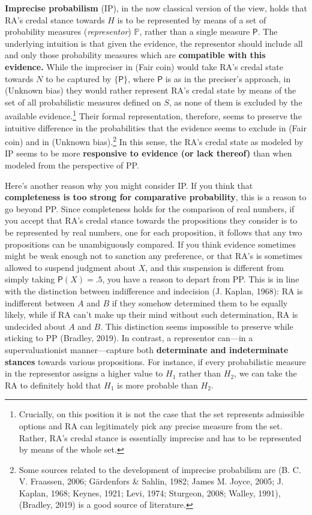 \documentclass[
  10pt,
  dvipsnames,enabledeprecatedfontcommands]{scrartcl}
\begin{document}
\textbf{Imprecise probabilism} (IP), in the now classical version of the
view, holds that RA's credal stance towards \(H\) is to be represented
by means of a set of probability measures (\emph{representor})
\(\mathbb{P}\), rather than a single measure \(\mathsf{P}\). The
underlying intuition is that given the evidence, the representor should
include all and only those probability measures which are
\textbf{compatible with this evidence.} While the impreciser in (Fair
coin) would take RA's credal state towards \(N\) to be captured by
\(\{\mathsf{P}\}\), where \(\mathsf{P}\) is as in the preciser's
approach, in (Unknown bias) they would rather represent RA's credal
state by means of the set of all probabilistic measures defined on
\(S\), as none of them is excluded by the available
evidence.\footnote{Crucially, on this position it is not the case that the set represents admissible options and RA can legitimately pick any precise measure from the set. Rather, RA's credal stance is essentially imprecise and has to be represented by means of the whole set.}
Their formal representation, therefore, seems to preserve the intuitive
difference in the probabilities that the evidence seems to exclude in
(Fair coin) and in (Unknown bias).\footnote{Some sources related to the
  development of imprecise probabilism are (B. C. V. Fraassen, 2006;
  Gärdenfors \& Sahlin, 1982; James M. Joyce, 2005; J. Kaplan, 1968;
  Keynes, 1921; Levi, 1974; Sturgeon, 2008; Walley, 1991), (Bradley,
  2019) is a good source of literature.} In this sense, the RA's credal
state as modeled by IP seems to be more
\textbf{responsive to evidence (or lack thereof)} than when modeled from
the perspective of PP.

Here's another reason why you might consider IP. If you think that
\textbf{completeness is too strong for comparative probability}, this is
a reason to go beyond PP. Since completeness holds for the comparison of
real numbers, if you accept that RA's credal stance towards the
propositions they consider is to be represented by real numbers, one for
each proposition, it follows that any two propositions can be
unambiguously compared. If you think evidence sometimes might be weak
enough not to sanction any preference, or that RA's is sometimes allowed
to suspend judgment about \(X\), and this suspension is different from
simply taking \(\mathsf{P}(X)=.5\), you have a reason to depart from PP.
This is in line with the distinction between indifference and indecision
(J. Kaplan, 1968): RA is indifferent between \(A\) and \(B\) if they
somehow determined them to be equally likely, while if RA can't make up
their mind without such determination, RA is undecided about \(A\) and
\(B\). This distinction seems impossible to preserve while sticking to
PP (Bradley, 2019). In contrast, a representor can---in a
supervaluationist manner---capture both
\textbf{determinate and indeterminate stances} towards various
propositions. For instance, if every probabilistic measure in the
representor assigns a higher value to \(H_1\) rather than \(H_2\), we
can take the RA to definitely hold that \(H_1\) is more probable than
\(H_2\).
\end{document}

